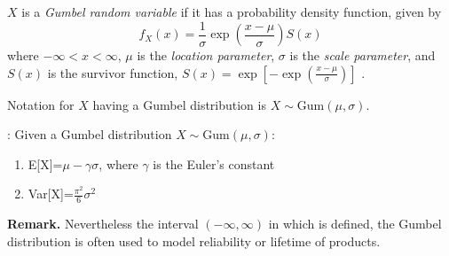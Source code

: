 \documentclass[12pt]{article}
\begin{document}
$X$ is a \emph{Gumbel random variable} if it has a probability density function, given by
$$f_X(x)=\frac{1}{\sigma}\exp(\frac{x-\mu}{\sigma})S(x)$$
where $-\infty <x<\infty $, $\mu$ is the \emph{location parameter}, $\sigma$ is the \emph{scale parameter}, and $S(x)$ is the survivor function, 
$S(x)=\exp[-\exp(\frac{x-\mu}{\sigma})]$ .

Notation for $X$ having a Gumbel distribution is $X\sim \mbox{Gum}(\mu,\sigma)$.

\textbf{}:
Given a Gumbel distribution $X\sim \mbox{Gum}(\mu,\sigma)$:
\begin{enumerate}
\item
E[X]=$\mu-\gamma\sigma$, where $\gamma$ is the Euler's constant
\item
Var[X]=$\frac{\pi^2}{6}\sigma^2$
\end{enumerate}

\textbf{Remark.}
Nevertheless the interval $(-\infty,\infty)$ in which is defined, the Gumbel distribution is often used to model reliability or lifetime of products.

\end{document}
